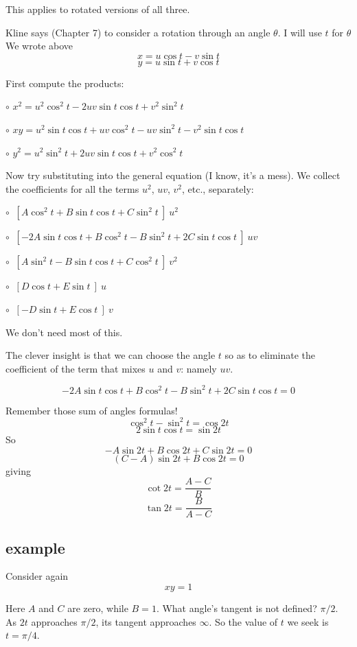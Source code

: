 \documentclass[11pt, oneside]{article}
\begin{document}
This applies to rotated versions of all three.

Kline says (Chapter 7) to consider a rotation through an angle $\theta$.  I will use $t$ for $\theta$ 
We wrote above
\[ x = u \cos t - v \sin t \]
\[ y = u \sin t + v \cos t \]

First compute the products: 

$\circ$  $x^2 = u^2 \cos^2 t - 2 uv \sin t \cos t + v^2 \sin^2 t$

$\circ$  $xy = u^2 \sin t \cos t + uv \cos^2 t - uv \sin^2 t - v^2 \sin t \cos t$

$\circ$  $y^2 = u^2 \sin^2 t + 2uv \sin t \cos t + v^2 \cos^2 t$

Now try substituting into the general equation (I know, it's a mess).  We collect the coefficients for all the terms $u^2$, $uv$, $v^2$, etc., separately:

$\circ$  $\ [ A \cos^2 t + B \sin t \cos t + C \sin^2 t \ ] \ u^2$

$\circ$  $\ [ -2A \sin t \cos t + B \cos^2 t - B \sin^2 t + 2C \sin t \cos t \ ] \ uv$

$\circ$  $\ [ A \sin^2 t - B \sin t \cos t + C \cos^2 t \ ] \ v^2$

$\circ$  $\ [ D \cos t + E \sin t \ ] \ u$

$\circ$  $\ [ -D \sin t + E \cos t \ ] \ v$

We don't need most of this.

The clever insight is that we can choose the angle $t$ so as to eliminate the coefficient of the term that mixes $u$ and $v$:  namely $uv$.

\[ -2A \sin t \cos t + B \cos^2 t - B \sin^2 t + 2C \sin t \cos t = 0 \]

Remember those sum of angles formulas!
\[ \cos^2 t - \sin^2 t = \cos 2 t \]
\[ 2 \sin t \cos t = \sin 2 t \]
So
\[ -A \sin 2t + B \cos 2t + C \sin 2t = 0 \]
\[ (C - A) \sin 2t + B \cos 2t = 0 \]
giving
\[ \cot 2t = \frac{A - C}{B} \]
\[ \tan 2t = \frac{B}{A - C} \]

\subsection*{example}

Consider again
\[ xy = 1 \]

Here $A$ and $C$ are zero, while $B = 1$.  What angle's tangent is not defined?  $\pi/2$. As $2t$ approaches $\pi/2$,  its tangent approaches $\infty$.  So the value of $t$ we seek is $t = \pi/4$.
\end{document}
